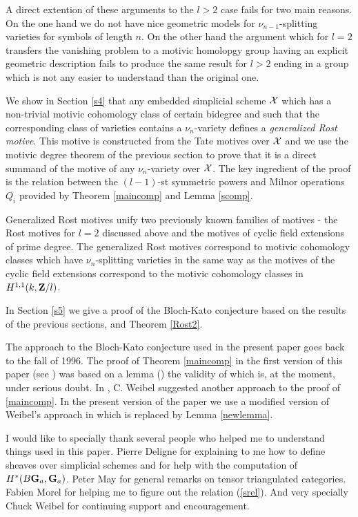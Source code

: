 \documentclass[11pt]{article}
\begin{document}
A direct extention of these arguments to the $l>2$ case fails for two
main reasons. On the one hand we do not have nice geometric models for
$\nu_{n-1}$-splitting varieties for symbols of length $n$. On the
other hand the argument which for $l=2$ transfers the vanishing problem to a motivic homolopgy group having an explicit 
geometric description fails to produce the same result for $l>2$
ending in a group which is not any easier to understand than the
original one. 

We show in Section \ref{s4} that any embedded simplicial scheme
$\cal X$ which has a non-trivial motivic cohomology class of certain
bidegree and such that the corresponding class of varieties contains a
$\nu_n$-variety defines a {\em generalized Rost motive}. This motive
is constructed from the Tate motives over $\cal X$ and we use the
motivic degree theorem of the previous section to prove that it is a
direct summand of the motive of any $\nu_{n}$-variety over
$\cal X$. The key ingredient of the proof is the relation between the
$(l-1)$-st symmetric powers and Milnor operations $Q_i$ provided by
Theorem \ref{maincomp} and Lemma \ref{scomp}. 

Generalized Rost motives unify two previously known families of
motives - the Rost motives for $l=2$ discussed above and the motives
of cyclic field extensions of prime degree. The generalized Rost
motives correspond to motivic cohomology classes which have
$\nu_{n}$-splitting varieties in the same way as the motives of the
cyclic field extensions correspond to the motivic cohomology classes
in $H^{1,1}(k,{\bf Z\rm}/l)$. 

In Section \ref{s5} we give a proof of the Bloch-Kato conjecture
based on the results of the previous sections, \cite{MCpub} and Theorem
\ref{Rost2}. 

The approach to the Bloch-Kato conjecture used in the present paper goes back to the fall of 1996. The proof of Theorem \ref{maincomp} in the first version of this paper (see \cite{motcoh}) was based on a lemma (\cite[Lemma 2.2]{motcoh}) the validity of which is, at the moment, under serious doubt. In  \cite{patching}, C. Weibel suggested another approach to the proof of \ref{maincomp}. In the present version of the paper we use a modified version of Weibel's approach in which \cite[Lemma 2.2]{motcoh} is replaced by Lemma \ref{newlemma}.

I would like to specially thank several people who helped me to
understand things used in this paper. Pierre Deligne for explaining to
me how to define sheaves over simplicial schemes and for help with the
computation of $H^{*}(B{\bf G}_a, {\bf G}_a)$. Peter May for
general remarks on tensor triangulated categories. Fabien Morel for
helping me to figure out the relation (\ref{srel}). And very specially Chuck Weibel for continuing support and encouragement. 
\end{document}
